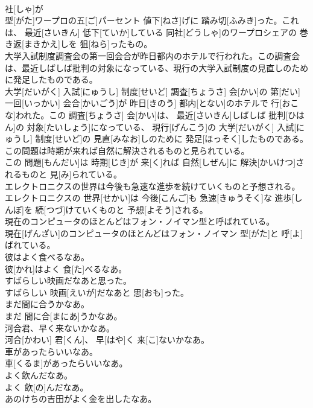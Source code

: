 \documentclass[8pt]{extreport}
\begin{document}
\begin{CJK}{UTF8}{min}
\\	社[しゃ]が 
\\	型[がた]ワープロの五[ご]パーセント 値下[ねさ]げに 踏み切[ふみき]った。これは、 最近[さいきん] 低下[ていか]している 同社[どうしゃ]のワープロシェアの 巻き返[まきかえ]しを 狙[ねら]ったもの。
\\	大学入試制度調査会の第一回会合が昨日都内のホテルで行われた。この調査会は、最近しばしば批判の対象になっている、現行の大学入試制度の見直しのために発足したものである。	
\\	大学[だいがく] 入試[にゅうし] 制度[せいど] 調査[ちょうさ] 会[かい]の 第[だい] 一回[いっかい] 会合[かいごう]が 昨日[きのう] 都内[とない]のホテルで 行[おこな]われた。この 調査[ちょうさ] 会[かい]は、 最近[さいきん]しばしば 批判[ひはん]の 対象[たいしょう]になっている、 現行[げんこう]の 大学[だいがく] 入試[にゅうし] 制度[せいど]の 見直[みなお]しのために 発足[ほっそく]したものである。
\\	この問題は時期が来れば自然に解決されるものと見られている。	
\\	この 問題[もんだい]は 時期[じき]が 来[く]れば 自然[しぜん]に 解決[かいけつ]されるものと 見[み]られている。
\\	エレクトロニクスの世界は今後も急速な進歩を続けていくものと予想される。	
\\	エレクトロニクスの 世界[せかい]は 今後[こんご]も 急速[きゅうそく]な 進歩[しんぽ]を 続[つづ]けていくものと 予想[よそう]される。
\\	現在のコンピュータのほとんどはフォン・ノイマン型と呼ばれている。	
\\	現在[げんざい]のコンピュータのほとんどはフォン・ノイマン 型[がた]と 呼[よ]ばれている。
\\	彼はよく食べるなあ。	
\\	彼[かれ]はよく 食[た]べるなあ。
\\	すばらしい映画だなあと思った。	
\\	すばらしい 映画[えいが]だなあと 思[おも]った。
\\	まだ間に合うかなあ。	
\\	まだ 間に合[まにあ]うかなあ。
\\	河合君、早く来ないかなあ。	
\\	河合[かわい] 君[くん]、 早[はや]く 来[こ]ないかなあ。
\\	車があったらいいなあ。	
\\	車[くるま]があったらいいなあ。
\\	よく飲んだなあ。	
\\	よく 飲[の]んだなあ。
\\	あのけちの吉田がよく金を出したなあ。	

\end{CJK}
\end{document}
